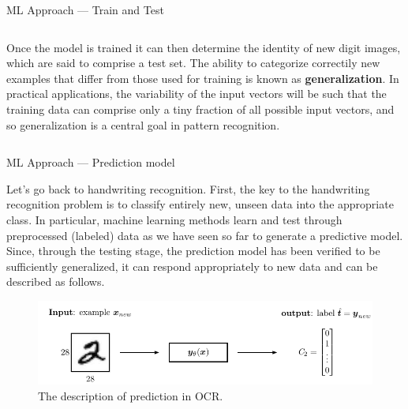 \documentclass{bredelebeamer}
\begin{document}
\begin{frame}{ML Approach --- Train and Test}
\begin{columns}
\begin{column}{0.6\textwidth}
\begin{itemize}
        \begin{justify}
          Once the model is trained it can then determine the identity of new
          digit images, which are said to comprise a test set. The ability to
          categorize correctily new examples that differ from those used for
          training is known as \textbf{generalization}. In practical
          applications, the variability of the input vectors will be such that
          the training data can comprise only a tiny fraction of all possible
          input vectors, and so generalization is a central goal in pattern
          recognition.
        \end{justify}
      \end{itemize}
    \end{column}
  \end{columns}
\end{frame}

\begin{frame}{ML Approach --- Prediction model}
  \begin{justify}
    Let's go back to handwriting recognition. First, the key to the handwriting
    recognition problem is to classify entirely new, unseen data into the
    appropriate class. In particular, machine learning methods learn and test
    through preprocessed (labeled) data as we have seen so far to generate a
    predictive model. Since, through the testing stage, the prediction model has
    been verified to be sufficiently generalized, it can respond appropriately
    to new data and can be described as follows.
  \end{justify}
  \begin{figure}[h]
  \centering
  \includegraphics[scale=0.8]{ocr_ml_desc.pdf}
  \caption{The description of prediction in OCR.}
  \end{figure}
\end{frame}
\end{document}

